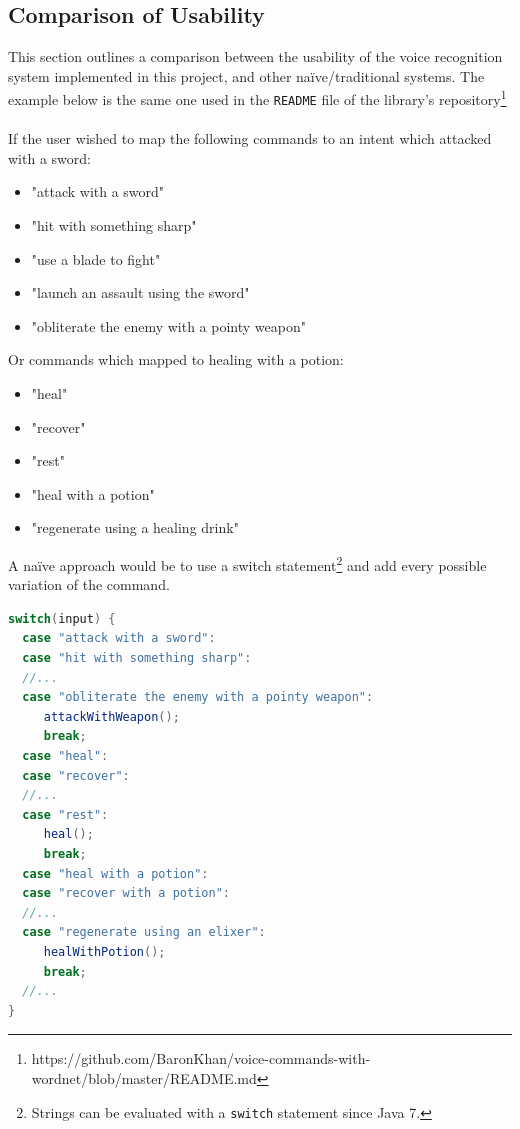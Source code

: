 \documentclass[11pt]{article}
\begin{document}
\newpage
\subsection{Comparison of Usability}
\label{appendix:comparison}

This section outlines a comparison between the usability of the voice recognition system implemented in this project, and other na\"ive/traditional systems. The example below is the same one used in the \texttt{README} file of the library's repository\footnote{https://github.com/BaronKhan/voice-commands-with-wordnet/blob/master/README.md}
\\
\\
If the user wished to map the following commands to an intent which attacked with a sword:

\begin{itemize}
\item "attack with a sword"
\item "hit with something sharp"
\item "use a blade to fight"
\item "launch an assault using the sword"
\item "obliterate the enemy with a pointy weapon"
\end{itemize}

Or commands which mapped to healing with a potion:

\begin{itemize}
\item "heal"
\item "recover"
\item "rest"
\item "heal with a potion"
\item "regenerate using a healing drink"
\end{itemize}

A na\"ive approach would be to use a switch statement\footnote{Strings can be evaluated with a \texttt{switch} statement since Java 7.} and add every possible variation of the command.

\begin{lstlisting}[language=Java]
switch(input) {
  case "attack with a sword":
  case "hit with something sharp":
  //...
  case "obliterate the enemy with a pointy weapon":
     attackWithWeapon();
     break;
  case "heal":
  case "recover":
  //...
  case "rest":
     heal();
     break;
  case "heal with a potion":
  case "recover with a potion":
  //...
  case "regenerate using an elixer":
     healWithPotion();
     break;
  //...
}
\end{lstlisting}
\end{document}
